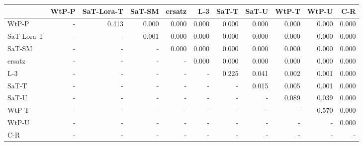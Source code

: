 \begin{tabular}{lrrrrrrrrrr}
\toprule
 & WtP-P & SaT-Lora-T & SaT-SM & ersatz & L-3 & SaT-T & SaT-U & WtP-T & WtP-U & C-R \\
\midrule
WtP-P & - & 0.413 & 0.000 & 0.000 & 0.000 & 0.000 & 0.000 & 0.000 & 0.000 & 0.000 \\
SaT-Lora-T & - & - & 0.001 & 0.000 & 0.000 & 0.000 & 0.000 & 0.000 & 0.000 & 0.000 \\
SaT-SM & - & - & - & 0.000 & 0.000 & 0.000 & 0.000 & 0.000 & 0.000 & 0.000 \\
ersatz & - & - & - & - & 0.000 & 0.000 & 0.000 & 0.000 & 0.000 & 0.000 \\
L-3 & - & - & - & - & - & 0.225 & 0.041 & 0.002 & 0.001 & 0.000 \\
SaT-T & - & - & - & - & - & - & 0.015 & 0.005 & 0.001 & 0.000 \\
SaT-U & - & - & - & - & - & - & - & 0.089 & 0.039 & 0.000 \\
WtP-T & - & - & - & - & - & - & - & - & 0.570 & 0.000 \\
WtP-U & - & - & - & - & - & - & - & - & - & 0.000 \\
C-R & - & - & - & - & - & - & - & - & - & - \\
\bottomrule
\end{tabular}

